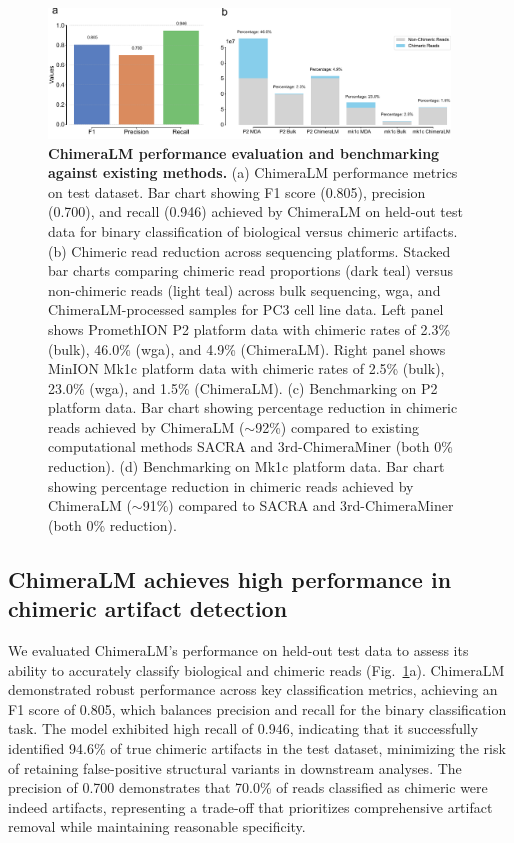 \documentclass[pdflatex,sn-nature]{sn-jnl}%
\theoremstyle{thmstyleone}%
\theoremstyle{thmstyletwo}%
\theoremstyle{thmstylethree}%
\begin{document}
\begin{figure}[!ht]
	\begin{center}
		\includegraphics[width=0.95\textwidth]{final_figures/figure2}
	\end{center}
	\caption{{\bf ChimeraLM performance evaluation and benchmarking against existing methods.}
		(a) ChimeraLM performance metrics on test dataset. Bar chart showing F1 score (0.805), precision (0.700), and recall (0.946) achieved by ChimeraLM on held-out test data for binary classification of biological versus chimeric artifacts.
		(b) Chimeric read reduction across sequencing platforms. Stacked bar charts comparing chimeric read proportions (dark teal) versus non-chimeric reads (light teal) across bulk sequencing, \gls{wga}, and ChimeraLM-processed samples for PC3 cell line data. Left panel shows PromethION P2 platform data with chimeric rates of 2.3\% (bulk), 46.0\% (\gls{wga}), and 4.9\% (ChimeraLM). Right panel shows MinION Mk1c platform data with chimeric rates of 2.5\% (bulk), 23.0\% (\gls{wga}), and 1.5\% (ChimeraLM).
		(c) Benchmarking on P2 platform data. Bar chart showing percentage reduction in chimeric reads achieved by ChimeraLM ($\sim$92\%) compared to existing computational methods SACRA and 3rd-ChimeraMiner (both 0\% reduction).
		(d) Benchmarking on Mk1c platform data. Bar chart showing percentage reduction in chimeric reads achieved by ChimeraLM ($\sim$91\%) compared to SACRA and 3rd-ChimeraMiner (both 0\% reduction).}\label{fig:figure2}
\end{figure}

\subsection*{ChimeraLM achieves high performance in chimeric artifact detection}

We evaluated ChimeraLM's performance on held-out test data to assess its ability to accurately classify biological and chimeric reads (Fig.~\ref{fig:figure2}a).
ChimeraLM demonstrated robust performance across key classification metrics, achieving an F1 score of 0.805, which balances precision and recall for the binary classification task.
The model exhibited high recall of 0.946, indicating that it successfully identified 94.6\% of true chimeric artifacts in the test dataset, minimizing the risk of retaining false-positive structural variants in downstream analyses.
The precision of 0.700 demonstrates that 70.0\% of reads classified as chimeric were indeed artifacts, representing a trade-off that prioritizes comprehensive artifact removal while maintaining reasonable specificity.
\end{document}
